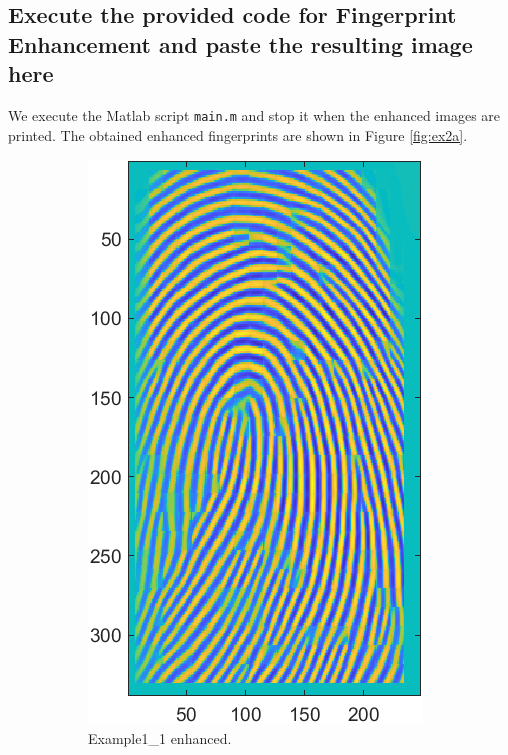 \documentclass[a4paper]{article}
\def\inline{\lstinline[basicstyle=\ttfamily,keywordstyle={}]}
\begin{document}
\subsection{ Execute the provided code for Fingerprint Enhancement and paste the resulting image here}

We execute the Matlab script \inline{main.m} and stop it when the enhanced images are printed. The obtained enhanced fingerprints are shown in Figure \ref{fig:ex2a}.



\begin{figure}[h!]
  \centering
       \begin{subfigure}[t]{0.45\textwidth}
         \centering
         \includegraphics[scale=0.8]{Figures/Enhanced1}
         \caption{Example1\_1 enhanced.}
     \end{subfigure}%
     \quad
     \begin{subfigure}[t]{0.45\textwidth}
         \centering

\end{subfigure}
\end{figure}
\end{document}

